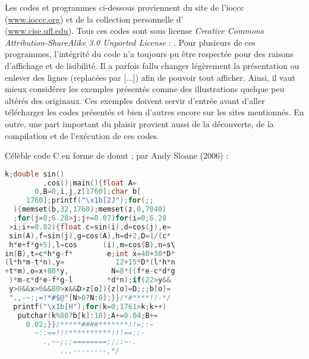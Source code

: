 \documentclass[12pt]{article} %
\begin{document}
Les codes et programmes ci-dessous proviennent du site de l'\acrshort{ioccc} \\(\href{https://www.ioccc.org/}{www.ioccc.org}) et de la collection personnelle d'\citeauthor{MEnriqueBermudez-ObfuscatedCCode} \\(\href{https://www.cise.ufl.edu/~manuel/obfuscate/obfuscate.html}{www.cise.ufl.edu}). Tous ces codes sont sous license {\itshape Creative Commons Attribution\hyp{}ShareAlike 3.0 Unported License} : . Pour plusieurs de ces programmes, l'intégrité du code n'a toujours pu être respectée pour des raisons d'affichage et de lisibilité. Il a parfois fallu changer légèrement la présentation ou enlever des lignes (replacées par [...]) afin de pouvoir tout afficher. Ainsi, il vaut mieux considérer les exemples présentés comme des illustrations quelque peu altérés des originaux. Ces exemples doivent servir d'entrée avant d'aller télécharger les codes présentés et bien d'autres encore sur les sites mentionnés. En outre, une part important du plaisir provient aussi de la découverte, de la compilation et de l'exécution de ces codes.

\newpage
Célèble code C en forme de donut ; par Andy Sloane (2006) :
\begin{lstlisting}[language=C, caption={Donut}, label={code:donut}]
                 k;double sin()
         ,cos();main(){float A=
       0,B=0,i,j,z[1760];char b[
     1760];printf("\x1b[2J");for(;;
  ){memset(b,32,1760);memset(z,0,7040)
  ;for(j=0;6.28>j;j+=0.07)for(i=0;6.28
 >i;i+=0.02){float c=sin(i),d=cos(j),e=
 sin(A),f=sin(j),g=cos(A),h=d+2,D=1/(c*
 h*e+f*g+5),l=cos      (i),m=cos(B),n=s\
in(B),t=c*h*g-f*        e;int x=40+30*D*
(l*h*m-t*n),y=            12+15*D*(l*h*n
+t*m),o=x+80*y,          N=8*((f*e-c*d*g
 )*m-c*d*e-f*g-l        *d*n);if(22>y&&
 y>0&&x>0&&80>x&&D>z[o]){z[o]=D;;;b[o]=
 ".,-~:;=!*#$@"[N>0?N:0];}}/*#****!!-*/
  printf("\x1b[H");for(k=0;1761>k;k++)
   putchar(k%80?b[k]:10);A+=0.04;B+=
     0.02;}}/*****####*******!!=;:~
       ~::==!!!**********!!!==::-
         .,~~;;;========;;;:~-.
             ..,--------,*/
\end{lstlisting}
\end{document}
